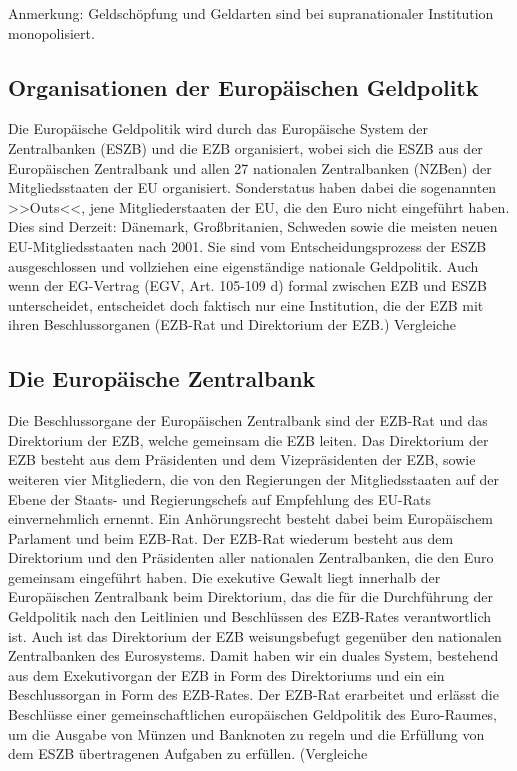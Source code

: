 \documentclass[
onecolumn,
a4paper,
abstracton,
parskip=half
,final
]{scrartcl}
\begin{document}
Anmerkung: Geldschöpfung und Geldarten sind bei supranationaler Institution monopolisiert.



\subsection{Organisationen der Europ{\"a}ischen Geldpolitk}

Die Europ{\"a}ische Geldpolitik wird durch das Europ{\"a}ische System der Zentralbanken (ESZB) und die EZB organisiert, wobei sich die ESZB aus der Europ{\"a}ischen Zentralbank und allen 27 nationalen Zentralbanken (NZBen) der Mitgliedsstaaten der EU organisiert.
Sonderstatus haben dabei die sogenannten >>Outs<<, jene Mitgliederstaaten der EU, die den Euro  nicht eingef{\"u}hrt haben. Dies sind Derzeit: D{\"a}nemark, Großbritanien, Schweden sowie die meisten neuen EU-Mitgliedsstaaten nach 2001. Sie sind vom Entscheidungsprozess der ESZB ausgeschlossen und vollziehen eine eigenst{\"a}ndige nationale Geldpolitik.
Auch wenn der EG-Vertrag (EGV, Art. 105-109 d) formal zwischen EZB und ESZB unterscheidet, entscheidet doch faktisch nur eine Institution, die der EZB mit ihren Beschlussorganen (EZB-Rat und Direktorium der EZB.) Vergleiche  %

\subsection{Die Europ{\"a}ische Zentralbank}
Die Beschlussorgane der Europ{\"a}ischen Zentralbank sind der EZB-Rat und das Direktorium der EZB, welche gemeinsam die EZB leiten. Das Direktorium der EZB besteht aus dem Pr{\"a}sidenten und dem Vizepr{\"a}sidenten der EZB, sowie weiteren vier Mitgliedern, die von den Regierungen der Mitgliedsstaaten auf der Ebene der Staats- und Regierungschefs auf Empfehlung des EU-Rats einvernehmlich ernennt. Ein Anh{\"o}rungsrecht besteht dabei beim Europ{\"a}ischem Parlament und beim EZB-Rat.
Der EZB-Rat wiederum besteht aus dem Direktorium und den Pr{\"a}sidenten aller nationalen Zentralbanken, die den Euro gemeinsam eingef{\"u}hrt haben.
Die exekutive Gewalt liegt innerhalb der Europ{\"a}ischen Zentralbank beim Direktorium, das die f{\"u}r die Durchf{\"u}hrung der Geldpolitik nach den Leitlinien und Beschl{\"u}ssen des EZB-Rates verantwortlich ist. Auch ist das Direktorium der EZB weisungsbefugt gegen{\"u}ber den nationalen Zentralbanken des Eurosystems.  Damit haben wir ein duales System, bestehend aus dem Exekutivorgan der EZB in Form des Direktoriums und ein ein Beschlussorgan in Form des EZB-Rates.
Der EZB-Rat erarbeitet und erl{\"a}sst die Beschl{\"u}sse einer gemeinschaftlichen europ{\"a}ischen Geldpolitik des Euro-Raumes, um die Ausgabe von M{\"u}nzen und Banknoten zu regeln und die Erf{\"u}llung von dem ESZB {\"u}bertragenen Aufgaben zu erf{\"u}llen.  (Vergleiche  %
\end{document}
